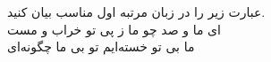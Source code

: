 عبارت زیر را در زبان مرتبه اول مناسب بیان کنید.\\
	ای ما و صد چو ما ز پی تو خراب و مست\\
	ما بی تو خسته‌ایم تو بی ما چگونه‌ای
